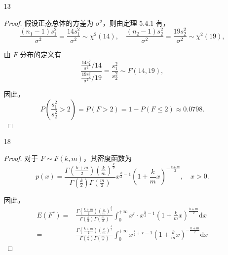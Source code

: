 \documentclass[normal,founder,mtpro2,cn]{elegantnote}
\begin{document}
\begin{enumerate}
\begin{proof}
            所以，由性质 3.4.13 有，对于二维正态分布 $(X_{1}+X_{2},X_{1}-X_{2})$，不相关与独立是等价的。

            于是，根据 F 分布的定义有
            \begin{equation*}
                Y=\left(\frac{X_{1}+X_{2}}{X_{1}-X_{2}}\right)^{2}=\frac{\frac{\left(X_{1}+X_{2}\right)^{2}}{2\sigma^{2}}}{\frac{\left(X_{1}-X_{2}\right)^{2}}{2\sigma^{2}}}\sim F(1,1)
            \end{equation*}
        \end{proof}
    \item[13]
        \begin{proof}
            假设正态总体的方差为 $\sigma^2$，则由定理 5.4.1 有，
            \begin{equation*}
                \frac{\left(n_{1}-1\right)s_{1}^{2}}{\sigma^{2}}=\frac{14s_{1}^{2}}{\sigma^{2}}\sim\chi^{2}(14),\quad\frac{\left(n_{2}-1\right)s_{2}^{2}}{\sigma^{2}}=\frac{19s_{2}^{2}}{\sigma^{2}}\sim\chi^{2}(19),
            \end{equation*}

            由 $F$ 分布的定义有
            \begin{equation*}
                \frac{\frac{14s_{1}^{2}}{\sigma^{2}}/14}{\frac{19s_{2}^{2}}{\sigma^{2}}/19}=\frac{s_{1}^{2}}{s_{2}^{2}}\sim F(14,19),
            \end{equation*}

            因此，
            \begin{equation*}
                P\left(\frac{s_{1}^{2}}{s_{2}^{2}}>2\right)=P(F>2)=1-P(F\leq 2)\approx 0.0798.
            \end{equation*}
        \end{proof}
    \item[18]
        \begin{proof}
            对于 $F\sim F(k,m)$，其密度函数为
            \begin{equation*}
                p(x)=\frac{\Gamma\left(\frac{k+m}{2}\right)\left(\frac{k}{m}\right)^{\frac{k}{2}}}{\Gamma\left(\frac{k}{2}\right)\Gamma\left(\frac{m}{2}\right)}x^{\frac{k}{2}-1}\left(1+\frac{k}{m}x\right)^{-\frac{k+m}{2}},\quad x>0.
            \end{equation*}

            因此，
            \begin{equation*}
                \begin{aligned}
                    E\left(F^{r}\right)= & \frac{\Gamma\left(\frac{k+m}{2}\right)\left(\frac{k}{m}\right)^{\frac{k}{2}}}{\Gamma\left(\frac{k}{2}\right)\Gamma\left(\frac{m}{2}\right)}\int_{0}^{+\infty}x^{r}\cdot x^{\frac{k}{2}-1}\left(1+\frac{k}{m}x\right)^{\frac{k+m}{2}}\mathrm{d}x \\
                    =                    & \frac{\Gamma\left(\frac{k+m}{2}\right)\left(\frac{k}{m}\right)^{\frac{k}{2}}}{\Gamma\left(\frac{k}{2}\right)\Gamma\left(\frac{m}{2}\right)}\int_{0}^{+\infty}x^{\frac{k}{2}+r-1}\left(1+\frac{k}{m}x\right)^{-\frac{k+m}{2}}\mathrm{d}x
                \end{aligned}
            \end{equation*}


\end{proof}
\end{enumerate}
\end{document}

